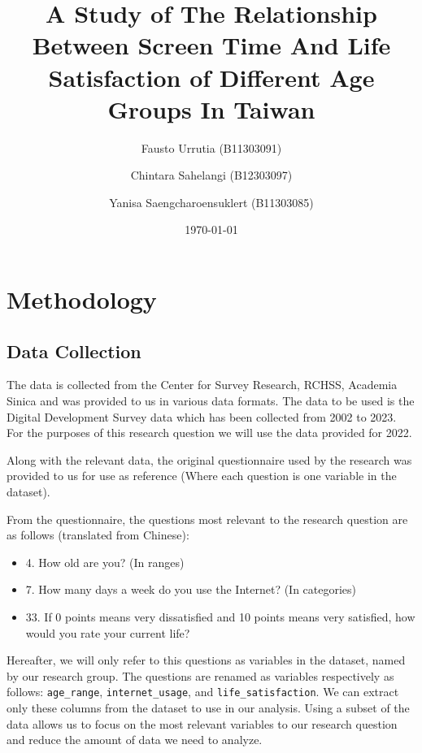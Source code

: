 \documentclass[12pt, a4paper]{article}
\title{\textbf{A Study of The Relationship Between Screen Time And Life Satisfaction of Different Age Groups In Taiwan}}
\author{
    {\small Fausto Urrutia (B11303091)} \and 
    {\small Chintara Sahelangi (B12303097)} \and 
    {\small Yanisa Saengcharoensuklert (B11303085)}}
\date{\today}
\begin{document}
\maketitle
\newpage


\section{Methodology}

\subsection{Data Collection}

\par The data is collected from the Center for Survey Research, RCHSS, Academia Sinica and was provided to us in various data formats. The data to be used is the Digital Development Survey data which has been collected from 2002 to 2023.
For the purposes of this research question we will use the data provided for 2022. 
\par Along with the relevant data, the original questionnaire used by the research was provided to us for use as reference (Where each question is one variable in the dataset).
\par From the questionnaire, the questions most relevant to the research question are as follows (translated from Chinese):
\begin{itemize}
    \item 4. How old are you? {\footnotesize(In ranges)}
    \item 7. How  many  days  a  week  do  you  use  the  Internet? {\footnotesize(In categories)}
    \item 33.  If  0  points  means  very  dissatisfied  and  10  points  means  very  satisfied,  how  would  you  rate  your  current  life?
\end{itemize}
\par Hereafter, we will only refer to this questions as variables in the dataset, named by our research group.
The questions are renamed as variables respectively as follows: \texttt{age\_range}, \texttt{internet\_usage}, and \texttt{life\_satisfaction}.
We can extract only these columns from the dataset to use in our analysis. Using a subset of the data allows us to focus on the most relevant variables to our research question and reduce the amount of data we need to analyze.
\end{document}
